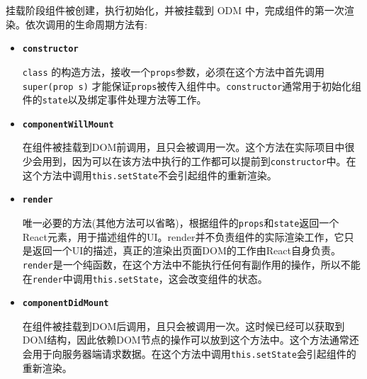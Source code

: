挂载阶段组件被创建，执行初始化，并被挂载到 ODM 中，完成组件的第一次渲染。依次调用的生命周期方法有:
\begin{itemize}
  \item \textbf{\texttt{constructor}}
  
  \texttt{class} 的构造方法，接收一个\texttt{props}参数，必须在这个方法中首先调用\texttt{super(prop s)} 才能保证\texttt{props}被传入组件中。\texttt{constructor}通常用于初始化组件的\texttt{state}以及绑定事件处理方法等工作。

  \item \textbf{\texttt{componentWillMount}}
  
  在组件被挂载到DOM前调用，且只会被调用一次。这个方法在实际项目中很少会用到，因为可以在该方法中执行的工作都可以提前到\texttt{constructor}中。在这个方法中调用\texttt{this.setState}不会引起组件的重新渲染。

  \item \textbf{\texttt{render}}
  
  唯一必要的方法(其他方法可以省略)，根据组件的\texttt{props}和\texttt{state}返回一个React元素，用于描述组件的UI。render并不负责组件的实际渲染工作，它只是返回一个UI的描述，真正的渲染出页面DOM的工作由React自身负责。\texttt{render}是一个纯函数，在这个方法中不能执行任何有副作用的操作，所以不能在\texttt{render}中调用\texttt{this.setState}，这会改变组件的状态。

  \item \textbf{\texttt{componentDidMount}}
  
  在组件被挂载到DOM后调用，且只会被调用一次。这时候已经可以获取到DOM结构，因此依赖DOM节点的操作可以放到这个方法中。这个方法通常还会用于向服务器端请求数据。在这个方法中调用\texttt{this.setState}会引起组件的重新渲染。
\end{itemize}

